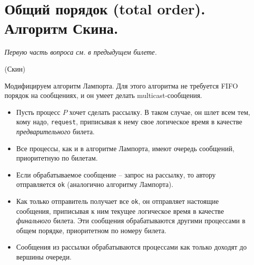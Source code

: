 \section{Общий порядок (total order). Алгоритм Скина.}

\textit{Первую часть вопроса см. в предыдущем билете.}

\begin{algorithm}(Скин)
    
    Модифицируем алгоритм Лампорта. Для этого алгоритма не требуется FIFO порядок 
    на сообщениях, и он умеет делать multicast-сообщения.
    \begin{itemize}
        \item Пусть процесс $P$ хочет сделать рассылку. В таком случае, он
            шлет всем тем, кому надо, \texttt{request}, приписывая к нему свое
            логическое время в качестве \textit{предварительного} билета.
        \item Все процессы, как и в алгоритме Лампорта, имеют очередь сообщений,
            приоритетную по билетам.
        \item Если обрабатываемое сообщение -- запрос на рассылку, то автору 
            отправляется \texttt{ok} (аналогично алгоритму Лампорта).
        \item Как только отправитель получает все \texttt{ok}, он отправляет настоящие
            сообщения, приписывая к ним текущее логическое время в качестве
            \textit{финального} билета. Эти сообщения обрабатываются другими 
            процессами в общем порядке, приоритетном по номеру билета.
        \item Сообщения из рассылки обрабатываются процессами как только доходят
            до вершины очереди.
    \end{itemize}
\end{algorithm}
